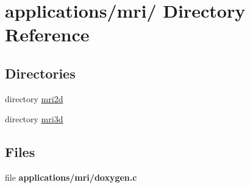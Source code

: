 \hypertarget{dir_000007}{
\section{applications/mri/ Directory Reference}
\label{dir_000007}
}
\subsection*{Directories}
\begin{CompactItemize}
\item 
directory \hyperlink{dir_000008}{mri2d}
\item 
directory \hyperlink{dir_000009}{mri3d}
\end{CompactItemize}
\subsection*{Files}
\begin{CompactItemize}
\item 
file {\bf applications/mri/doxygen.c}
\end{CompactItemize}
